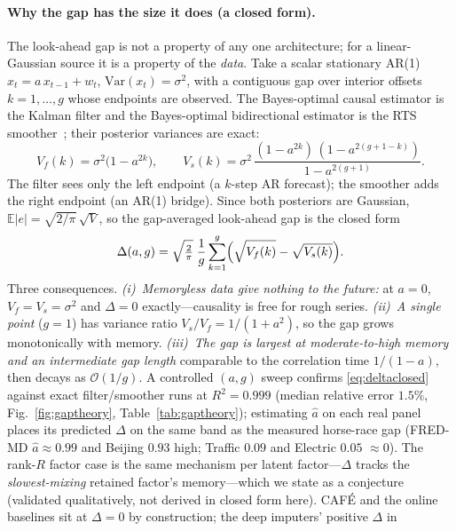 \documentclass[10pt,twocolumn]{article}
\newcommand{\cafe}{CAF\'E}
\begin{document}
\paragraph{Why the gap has the size it does (a closed form).}
The look-ahead gap is not a property of any one architecture; for a linear-Gaussian
source it is a property of the \emph{data}. Take a scalar stationary AR(1)
$x_t=a\,x_{t-1}+w_t$, $\mathrm{Var}(x_t)=\sigma^2$, with a contiguous gap over interior
offsets $k=1,\dots,g$ whose endpoints are observed. The Bayes-optimal causal estimator is
the Kalman filter and the Bayes-optimal bidirectional estimator is the RTS
smoother~\cite{kalman1960,rts1965,andersonmoore1979}; their posterior variances are exact:
\begin{equation}
V_f(k)=\sigma^2\bigl(1-a^{2k}\bigr),\qquad
V_s(k)=\sigma^2\,\frac{(1-a^{2k})\,(1-a^{2(g+1-k)})}{1-a^{2(g+1)}} .
\label{eq:filtsmooth}
\end{equation}
The filter sees only the left endpoint (a $k$-step AR forecast); the smoother adds the
right endpoint (an AR(1) bridge). Since both posteriors are Gaussian,
$\mathbb{E}|e|=\sqrt{2/\pi}\,\sqrt{V}$, so the gap-averaged look-ahead gap is the closed
form
\begin{equation}
\Delta(a,g)=\sqrt{\tfrac{2}{\pi}}\;\frac1g\sum_{k=1}^{g}\Bigl(\sqrt{V_f(k)}-\sqrt{V_s(k)}\Bigr).
\label{eq:deltaclosed}
\end{equation}
Three consequences. \emph{(i)~Memoryless data give nothing to the future:} at $a=0$,
$V_f=V_s=\sigma^2$ and $\Delta=0$ exactly---causality is free for rough series.
\emph{(ii)~A single point} ($g=1$) has variance ratio $V_s/V_f=1/(1+a^2)$, so the gap
grows monotonically with memory. \emph{(iii)~The gap is largest at moderate-to-high memory
and an intermediate gap length} comparable to the correlation time $1/(1-a)$, then decays
as $\mathcal{O}(1/g)$. A controlled $(a,g)$ sweep confirms \eqref{eq:deltaclosed} against
exact filter/smoother runs at $R^2=0.999$ (median relative error $1.5\%$,
Fig.~\ref{fig:gaptheory}, Table~\ref{tab:gaptheory}); estimating $\hat a$ on each real
panel places its predicted $\Delta$ on the same band as the measured horse-race gap
(FRED-MD $\hat a{\approx}0.99$ and Beijing $0.93$ high; Traffic $0.09$ and Electric $0.05$
$\approx0$). The rank-$R$ factor case is the same mechanism per latent factor---$\Delta$
tracks the \emph{slowest-mixing} retained factor's memory---which we state as a conjecture
(validated qualitatively, not derived in closed form here). \cafe{} and the online
baselines sit at $\Delta=0$ by construction; the deep imputers' positive $\Delta$ in
\end{document}
